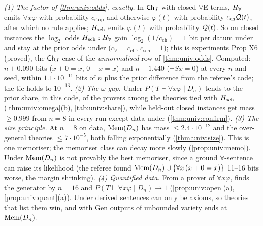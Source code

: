 \noindent\emph{(1) The factor of \cref{thm:univ:odds}, exactly.} In $\mathsf{Ch}_{J}$ with closed $\forall$E terms, $H_{\forall}$ emits $\forall x\varphi$ with probability $c_{\mathrm{stop}}$ and otherwise $\varphi(t)$ with probability $c_{\mathrm{ch}}\mathcal{Q}(t)$, after which no rule applies; $H_{\mathrm{sch}}$ emits $\varphi(t)$ with probability $\mathcal{Q}(t)$. So on closed instances the $\log_2$ odds $H_{\mathrm{sch}}:H_{\forall}$ gain $\log_2(1/c_{\mathrm{ch}})=1$ bit per datum under \Lone{} and stay at the prior odds under \Lselc{} ($c_\forall=c_{\mathrm{ch}}$, $c_{\mathrm{sch}}=1$); this is experiments Prop X6 (proved), the $\mathsf{Ch}_{J}$ case of the \emph{unnormalised} row of \cref{thm:univ:odds}. Computed: $n+0.090$ bits ($x+0=x$, $0+x=x$) and $n+1.440$ ($\neg Sx=0$) at every $n$ and seed, within $1.1\cdot10^{-11}$ bits of $n$ plus the prior difference from the referee's code; the \Lselc{} tie holds to $10^{-13}$.
\emph{(2) The $\omega$-gap.} Under \Lselc{} $P(T\vdash\forall x\varphi\mid D_n)$ tends to the prior share, in this code, of the provers among the theories tied with $H_{\mathrm{sch}}$ (\cref{thm:univ:omega}(b), \cref{tab:univ:share}), while held-out closed instances get mass $\ge0.999$ from $n=8$ in every run except  data under \Lzero{} (\cref{thm:univ:confirm}).
\emph{(3) The size principle.} At $n=8$ on  data, $\mathrm{Mem}(D_n)$ has mass $\le2.4\cdot10^{-12}$ and the over-general theories $\le7\cdot10^{-5}$, both falling exponentially (\cref{thm:univ:size}). This is one memoriser; the memoriser class can decay more slowly (\cref{prop:univ:memo}). Under \Lone{} $\mathrm{Mem}(D_n)$ is not provably the best memoriser, since a ground $\forall$-sentence can raise its likelihood (the referee found $\mathrm{Mem}(D_n)\cup\{\forall x\,(x+0=x)\}$ 11--16 bits worse, the margin shrinking).
\emph{(4) Quantified data.} From a prover of $\forall x\varphi$, \Lone{} finds the generator by $n=16$ and $P(T\vdash\forall x\varphi\mid D_n)\to1$ (\cref{prop:univ:open}(a), \cref{prop:univ:quant}(a)). Under \Lzero{} derived sentences can only be axioms, so theories that list them win, and with Gen outputs of unbounded variety \Lzero{} ends at $\mathrm{Mem}(D_n)$.

